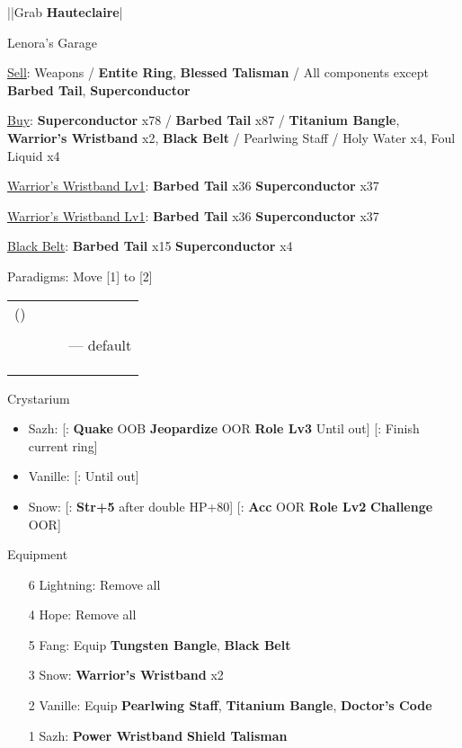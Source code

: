 \begin{mainlist}
	\item \skip|\skip|Grab \textbf{Hauteclaire}|\skip
\end{mainlist}
\begin{shop}{Lenora's Garage}
	\item \underline{Sell}: Weapons / \textbf{Entite Ring}, \textbf{Blessed Talisman} / All components except \textbf{Barbed Tail}, \textbf{Superconductor}
	\item \underline{Buy}: \textbf{Superconductor} x78 / \textbf{Barbed Tail} x87 / \textbf{Titanium Bangle}, \textbf{Warrior's Wristband} x2, \textbf{Black Belt} / Pearlwing Staff / Holy Water x4, Foul Liquid x4
\end{shop}
\begin{upgrade}
	\item \underline{Warrior's Wristband Lv1}: \textbf{Barbed Tail} x36 \to \textbf{Superconductor} x37
	\item \underline{Warrior's Wristband Lv1}: \textbf{Barbed Tail} x36 \to \textbf{Superconductor} x37
	\item \underline{Black Belt}: \textbf{Barbed Tail} x15 \to \textbf{Superconductor} x4
\end{upgrade}
\begin{menu}
	\item Paradigms: Move [1] to [2]
	\begin{tabular}{cccl}
		(\syn) & \sab & \rav &             \\
		\com   & \med & \com &             \\
		\syn   & \med & \com & --- default \\
		\com   & \sab & \com &             \\
		\syn   & \sab & \com &             \\
		\com   & \rav & \com &
	\end{tabular}
	\item Crystarium
	\begin{itemize}
		\item Sazh: [\com: \textbf{Quake} OOB \to \textbf{Jeopardize} OOR \to \textbf{Role Lv3} \to Until out] [\rav: Finish current ring]
		\item Vanille: [\med: Until out]
		\item Snow: [\rav: \textbf{Str+5} after double HP+80] [\sen: \textbf{Acc} OOR \to \textbf{Role Lv2} \to \textbf{Challenge} OOR]
	\end{itemize}
	\item Equipment
	\begin{itemize}
		\item [6] Lightning: Remove all
		\item [4] Hope: Remove all
		\item [5] Fang: Equip \textbf{Tungsten Bangle}, \textbf{Black Belt}
		\item [3] Snow: \textbf{Warrior's Wristband\star} x2
		\item [2] Vanille: Equip \textbf{Pearlwing Staff}, \textbf{Titanium Bangle}, \textbf{Doctor's Code}
		\item [1] Sazh: \textbf{Power Wristband} \to \textbf{Shield Talisman}
	\end{itemize}
\end{menu}
